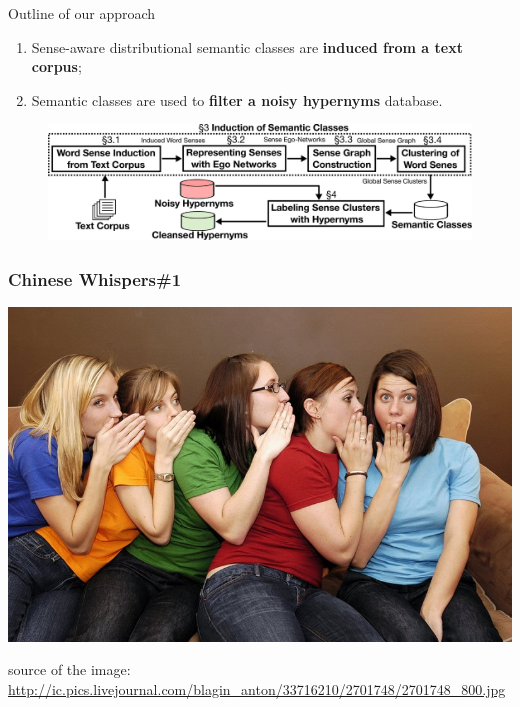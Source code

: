 \documentclass[usenames,dvipsnames]{beamer}
\begin{document}
\begin{frame}{Outline of our approach}



\begin{enumerate}
	\item Sense-aware distributional semantic classes are \textbf{induced from a text corpus}; 
	\item Semantic classes are used to \textbf{filter a noisy hypernyms} database. 
 
\end{enumerate}

\pause 


\begin{figure}
  \centering
  \includegraphics[width=.99\textwidth]{figures/outline}
  \end{figure}



\end{frame}


\begin{frame}[fragile]
\frametitle{Chinese Whispers\#1}
\begin{center}
 \includegraphics[height=0.5\textwidth]{figures/cw}
 
  {\tiny * source of the image: \url{http://ic.pics.livejournal.com/blagin_anton/33716210/2701748/2701748_800.jpg}}
 \end{center}
\end{frame}
\end{document}
